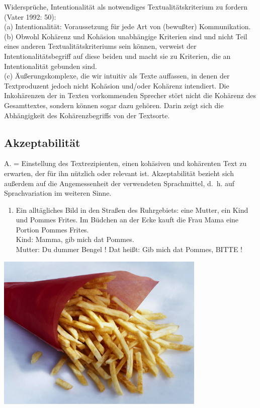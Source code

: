 \documentclass[
  letterpaper,
  DIV=11,
  numbers=noendperiod]{scrreprt}
\providecommand{\tightlist}{%
  \setlength{\itemsep}{0pt}\setlength{\parskip}{0pt}}\usepackage{longtable,booktabs,array}
\begin{document}
Widersprüche, Intentionalität als notwendiges Textualitätskriterium zu
fordern (Vater 1992: 50):\\
(a) Intentionalität: Voraussetzung für jede Art von (bewußter)
Kommunikation.\\
(b) Obwohl Kohärenz und Kohäsion unabhängige Kriterien sind und nicht
Teil eines anderen Textualitätskriteriums sein können, verweist der
Intentionalitätsbegriff auf diese beiden und macht sie zu Kriterien, die
an Intentionalität gebunden sind.\\
(c) Äußerungskomplexe, die wir intuitiv als Texte auffassen, in denen
der Textproduzent jedoch nicht Kohäsion und/oder Kohärenz intendiert.
Die Inkohärenzen der in Texten vorkommenden Sprecher stört nicht die
Kohärenz des Gesamttextes, sondern können sogar dazu gehören. Darin
zeigt sich die Abhängigkeit des Kohärenzbegriffs von der Textsorte.

\hypertarget{akzeptabilituxe4t}{%
\subsection{Akzeptabilität}\label{akzeptabilituxe4t}}

A. = Einstellung des Textrezipienten, einen kohäsiven und kohärenten
Text zu erwarten, der für ihn nützlich oder relevant ist. Akzeptabilität
bezieht sich außerdem auf die Angemessenheit der verwendeten
Sprachmittel, d.~h. auf Sprachvariation im weiteren Sinne.

\begin{enumerate}
\def\labelenumi{(\arabic{enumi})}
\setcounter{enumi}{11}
\tightlist
\item
  Ein alltägliches Bild in den Straßen des Ruhrgebiets: eine Mutter, ein
  Kind und Pommes Frites. Im Büdchen an der Ecke kauft die Frau Mama
  eine Portion Pommes Frites.\\
  Kind: Mamma, gib mich dat Pommes.\\
  Mutter: Du dummer Bengel ! Dat heißt: Gib mich dat Pommes, BITTE !
\end{enumerate}

\includegraphics[width=0.75\textwidth,height=\textheight]{./pictures/textkriterien_8.jpg}
\end{document}
